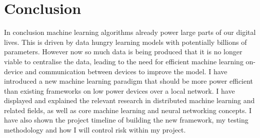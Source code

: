 \section{Conclusion}
In conclusion machine learning algorithms already power large parts of our
digital lives. This is driven by data hungry learning models with potentially
billions of parameters. However now so much data is being produced that it is no
longer viable to centralise the data, leading to the need for efficient machine
learning on-device and communication between devices to improve the model. I
have introduced a new machine learning paradigm that should be more power
efficient than existing frameworks on low power devices over a local network. I
have displayed and explained the relevant research in distributed machine
learning and related fields, as well as core machine learning and neural
networking concepts. I have also shown the project timeline of building the new
framework, my testing methodology and how I will control risk within my project.
